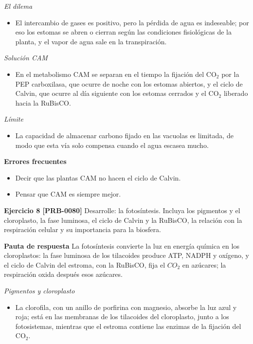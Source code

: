\documentclass{book}
\begin{document}
\noindent\textit{El dilema}
\begin{itemize}
\item El intercambio de gases es positivo, pero la pérdida de agua es indeseable; por eso los estomas se abren o cierran según las condiciones fisiológicas de la planta, y el vapor de agua sale en la transpiración.
\end{itemize}

\noindent\textit{Solución CAM}
\begin{itemize}
\item En el metabolismo CAM se separan en el tiempo la fijación del CO\({}_{2}\) por la PEP carboxilasa, que ocurre de noche con los estomas abiertos, y el ciclo de Calvin, que ocurre al día siguiente con los estomas cerrados y el CO\({}_{2}\) liberado hacia la RuBisCO.
\end{itemize}

\noindent\textit{Límite}
\begin{itemize}
\item La capacidad de almacenar carbono fijado en las vacuolas es limitada, de modo que esta vía solo compensa cuando el agua escasea mucho.
\end{itemize}

\noindent\textbf{Errores frecuentes}
\begin{itemize}
\item Decir que las plantas CAM no hacen el ciclo de Calvin.
\item Pensar que CAM es siempre mejor.
\end{itemize}

\noindent\textbf{Ejercicio 8 [PRB-0080]}
Desarrolle: la fotosíntesis. Incluya los pigmentos y el cloroplasto, la fase luminosa, el ciclo de Calvin y la RuBisCO, la relación con la respiración celular y su importancia para la biosfera.


\noindent\textbf{Pauta de respuesta}
La fotosíntesis convierte la luz en energía química en los cloroplastos: la fase luminosa de los tilacoides produce ATP, NADPH y oxígeno, y el ciclo de Calvin del estroma, con la RuBisCO, fija el \(CO_{2}\) en azúcares; la respiración oxida después esos azúcares.


\noindent\textit{Pigmentos y cloroplasto}
\begin{itemize}
\item La clorofila, con un anillo de porfirina con magnesio, absorbe la luz azul y roja; está en las membranas de los tilacoides del cloroplasto, junto a los fotosistemas, mientras que el estroma contiene las enzimas de la fijación del CO\({}_{2}\).
\end{itemize}
\end{document}
